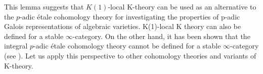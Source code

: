 \documentclass[11pt]{amsart}
\newcommand{\Z}{\mathbb{Z}}
\newcommand{\sC}{\mathcal{C}}
\newcommand{\sF}{\mathcal{F}}
\newcommand{\LK}{{L_{K(1)}}}
\newcommand{\et}{{\operatorname{\acute{e}t}}}
\newcommand{\Cat}{\operatorname{Cat_{\infty}^{perf}}}
\newcounter{spec}
\newcommand{\Sp}{\operatorname{Sp}}
\theoremstyle{definition}
\theoremstyle{remark}
\numberwithin{equation}{section}
\begin{document}
This lemma suggests that $K(1)$-local K-theory can be used as an alternative to the $p$-adic \'etale cohomology theory for investigating the properties of p-adic Galois representations of algebraic varieties. K(1)-local K theory can also be defined for a stable $\infty$-category. On the other hand, it has been shown that the integral $p$-adic \'etale cohomology theory cannot be defined for a stable $\infty$-category (see \cite{fundamentalisnotderived}). Let us apply this perspective to other cohomology theories and variants of K-theory.

\end{document}
